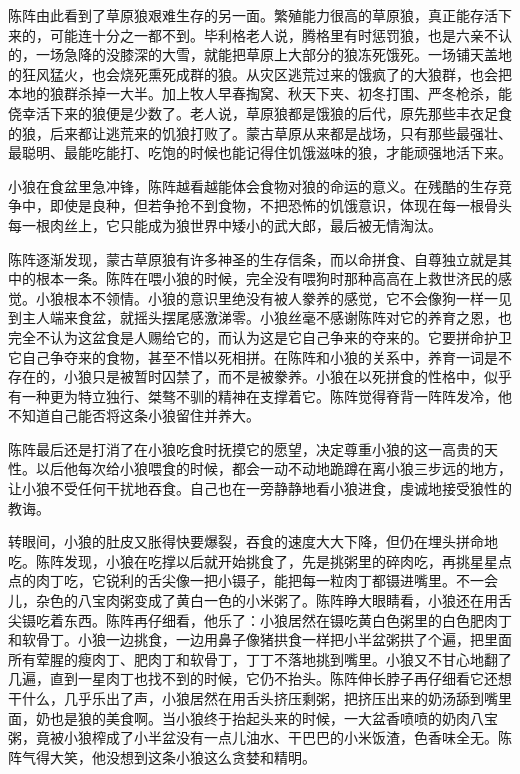 \par 陈阵由此看到了草原狼艰难生存的另一面。繁殖能力很高的草原狼，真正能存活下来的，可能连十分之一都不到。毕利格老人说，腾格里有时惩罚狼，也是六亲不认的，一场急降的没膝深的大雪，就能把草原上大部分的狼冻死饿死。一场铺天盖地的狂风猛火，也会烧死熏死成群的狼。从灾区逃荒过来的饿疯了的大狼群，也会把本地的狼群杀掉一大半。加上牧人早春掏窝、秋天下夹、初冬打围、严冬枪杀，能侥幸活下来的狼便是少数了。老人说，草原狼都是饿狼的后代，原先那些丰衣足食的狼，后来都让逃荒来的饥狼打败了。蒙古草原从来都是战场，只有那些最强壮、最聪明、最能吃能打、吃饱的时候也能记得住饥饿滋味的狼，才能顽强地活下来。
\par 小狼在食盆里急冲锋，陈阵越看越能体会食物对狼的命运的意义。在残酷的生存竞争中，即使是良种，但若争抢不到食物，不把恐怖的饥饿意识，体现在每一根骨头每一根肉丝上，它只能成为狼世界中矮小的武大郎，最后被无情淘汰。
\par 陈阵逐渐发现，蒙古草原狼有许多神圣的生存信条，而以命拼食、自尊独立就是其中的根本一条。陈阵在喂小狼的时候，完全没有喂狗时那种高高在上救世济民的感觉。小狼根本不领情。小狼的意识里绝没有被人豢养的感觉，它不会像狗一样一见到主人端来食盆，就摇头摆尾感激涕零。小狼丝毫不感谢陈阵对它的养育之恩，也完全不认为这盆食是人赐给它的，而认为这是它自己争来的夺来的。它要拼命护卫它自己争夺来的食物，甚至不惜以死相拼。在陈阵和小狼的关系中，养育一词是不存在的，小狼只是被暂时囚禁了，而不是被豢养。小狼在以死拼食的性格中，似乎有一种更为特立独行、桀骜不驯的精神在支撑着它。陈阵觉得脊背一阵阵发冷，他不知道自己能否将这条小狼留住并养大。
\par 陈阵最后还是打消了在小狼吃食时抚摸它的愿望，决定尊重小狼的这一高贵的天性。以后他每次给小狼喂食的时候，都会一动不动地跪蹲在离小狼三步远的地方，让小狼不受任何干扰地吞食。自己也在一旁静静地看小狼进食，虔诚地接受狼性的教诲。
\par 转眼间，小狼的肚皮又胀得快要爆裂，吞食的速度大大下降，但仍在埋头拼命地吃。陈阵发现，小狼在吃撑以后就开始挑食了，先是挑粥里的碎肉吃，再挑星星点点的肉丁吃，它锐利的舌尖像一把小镊子，能把每一粒肉丁都镊进嘴里。不一会儿，杂色的八宝肉粥变成了黄白一色的小米粥了。陈阵睁大眼睛看，小狼还在用舌尖镊吃着东西。陈阵再仔细看，他乐了：小狼居然在镊吃黄白色粥里的白色肥肉丁和软骨丁。小狼一边挑食，一边用鼻子像猪拱食一样把小半盆粥拱了个遍，把里面所有荤腥的瘦肉丁、肥肉丁和软骨丁，丁丁不落地挑到嘴里。小狼又不甘心地翻了几遍，直到一星肉丁也找不到的时候，它仍不抬头。陈阵伸长脖子再仔细看它还想干什么，几乎乐出了声，小狼居然在用舌头挤压剩粥，把挤压出来的奶汤舔到嘴里面，奶也是狼的美食啊。当小狼终于抬起头来的时候，一大盆香喷喷的奶肉八宝粥，竟被小狼榨成了小半盆没有一点儿油水、干巴巴的小米饭渣，色香味全无。陈阵气得大笑，他没想到这条小狼这么贪婪和精明。
